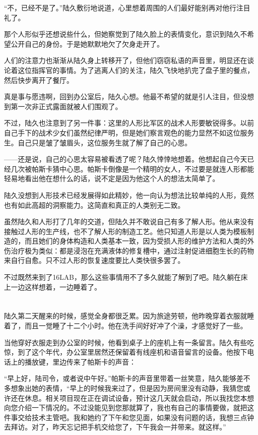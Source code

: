 “不，已经不是了。”陆久敷衍地说道，心里想着周围的人们最好能别再对他行注目礼了。

那个人形似乎还想说些什么，但她察觉到了陆久脸上的表情变化，意识到陆久不希望公开自己的身份。于是她默默地欠了欠身走开了。

人们的注意力也渐渐从陆久身上转移开了，但他们窃窃私语的声音里，明显还在谈论着这位指挥官的事情。为了逃离人们的关注，陆久飞快地扒完了盘子里的餐点，然后快步离开了餐厅。

真是事与愿违啊，回到办公室后，陆久心想。他最不希望的就是引人注目，但没想到第一次非正式露面就被人们围观了。

不过，陆久也注意到了另一件事：这里的人形比军区的战术人形要敏锐得多。以前自己手下的战术少女们虽然纪律严明，但是她们察言观色的能力显然不如这位服务生。自己只是皱了皱眉头，这位服务生就了解了自己的心思。

——还是说，自己的心思太容易被看透了呢？陆久悻悻地想着。他想起自己今天已经几次被帕斯卡猜中心思。帕斯卡倒像是一个精明的女人，不过要是就连人形都能轻易地看出他在想什么的话，说不定是因为他这个人的想法太简单了。

陆久没想到人形技术已经发展得如此精妙，他一向认为想法比较单纯的人形，竟然也有如此高超的洞察能力。这简直和真正的人类别无二致。

虽然陆久和人形打了几年的交道，但陆久并不敢说自己有多了解人形。他从来没有接触过人形的生产线，也不了解人形的制造工艺。他只知道人形是以人类为模板制造的，而且她们的身体构造和人类基本一致，因为受损人形的维护方法和人类的外伤治疗极为类似：都是浸泡在充满液体的修复槽中，通过注射促进细胞生长的药物来自行自愈。只不过人形的恢复速度要比人类快很多罢了。

不过既然来到了16LAB，那么这些事情用不了多久就能了解到了吧。陆久躺在床上一边这样想着，一边睡着了。

\section*{}

陆久第二天醒来的时候，感觉全身都很乏累。因为旅途劳顿，他昨晚穿着衣服就睡着了，而且一觉睡了十二个小时。他在洗手间好好冲了个澡，才感觉好了一些。

当他穿好衣服走到办公室的时候，他看到桌子上的座机上有一条留言。陆久有些吃惊，到了这个年代，办公室里居然还保留着有线座机和语音留言的设备。他按下电话上的播放键，里边传来了帕斯卡的声音：

“早上好，陆司令，或者说中午好。”帕斯卡的声音里带着一丝笑意，陆久能够差不多想象出她的表情，“早上的时候我来过了，但是因为房间里没有动静，我猜您或许还在休息。相关项目现在正在调试设备，预计这几天就会启动，所以我找您本想向您介绍一下情况的。不过没能见到您那就算了，我也有自己的事情要做，就把这件事交给技术主管吧。我和她约了下午和您见面，如果没有问题的话，我想三点钟去拜访。对了，昨天忘记把手机交给您了，下午我会一并带来。就这样。”

